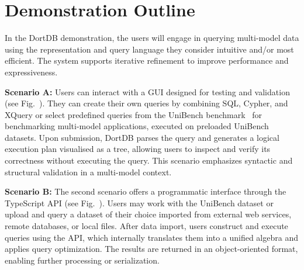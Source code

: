 \section{Demonstration Outline}

In the DortDB demonstration, the users will engage in querying multi-model data using the representation and query language they consider intuitive and/or most efficient. The system supports iterative refinement %
to improve performance and expressiveness.

\textbf{Scenario A:} Users can interact with a GUI designed for testing and validation (see Fig.~). They can create their own queries by combining SQL, Cypher, and XQuery or select predefined queries from the UniBench benchmark~\citep{unibench} for benchmarking multi-model applications, executed on preloaded UniBench datasets. Upon submission, DortDB parses the query and generates a logical execution plan visualised as a tree, allowing users to inspect and verify its correctness without executing the query. This scenario emphasizes syntactic and structural validation in a multi-model context.

\textbf{Scenario B:}  The second scenario offers a programmatic interface through the TypeScript API (see Fig.~). Users may work with the UniBench dataset or upload and query a dataset of their choice imported from external web services, remote databases, or local files. After data import, users construct and execute queries using the API, which internally translates them into a unified algebra and applies query optimization. The results are returned in an object-oriented format, enabling further processing or serialization.%


